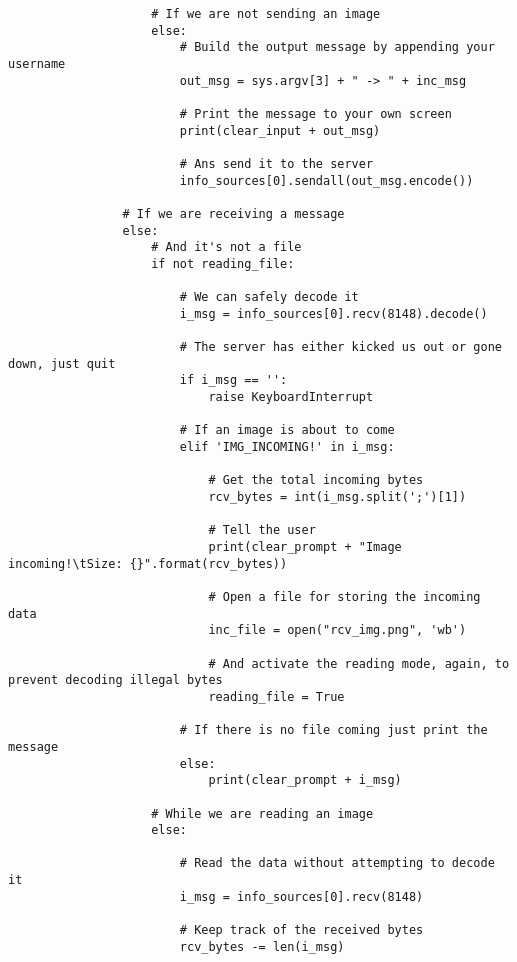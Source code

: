 \documentclass[landscape]{article}
\begin{document}
\begin{verbatim}
                    # If we are not sending an image
                    else:
                        # Build the output message by appending your username
                        out_msg = sys.argv[3] + " -> " + inc_msg

                        # Print the message to your own screen
                        print(clear_input + out_msg)

                        # Ans send it to the server
                        info_sources[0].sendall(out_msg.encode())

                # If we are receiving a message
                else:
                    # And it's not a file
                    if not reading_file:

                        # We can safely decode it
                        i_msg = info_sources[0].recv(8148).decode()

                        # The server has either kicked us out or gone down, just quit
                        if i_msg == '':
                            raise KeyboardInterrupt

                        # If an image is about to come
                        elif 'IMG_INCOMING!' in i_msg:

                            # Get the total incoming bytes
                            rcv_bytes = int(i_msg.split(';')[1])

                            # Tell the user
                            print(clear_prompt + "Image incoming!\tSize: {}".format(rcv_bytes))

                            # Open a file for storing the incoming data
                            inc_file = open("rcv_img.png", 'wb')

                            # And activate the reading mode, again, to prevent decoding illegal bytes
                            reading_file = True

                        # If there is no file coming just print the message
                        else:
                            print(clear_prompt + i_msg)

                    # While we are reading an image
                    else:

                        # Read the data without attempting to decode it
                        i_msg = info_sources[0].recv(8148)

                        # Keep track of the received bytes
                        rcv_bytes -= len(i_msg)


\end{verbatim}
\end{document}
